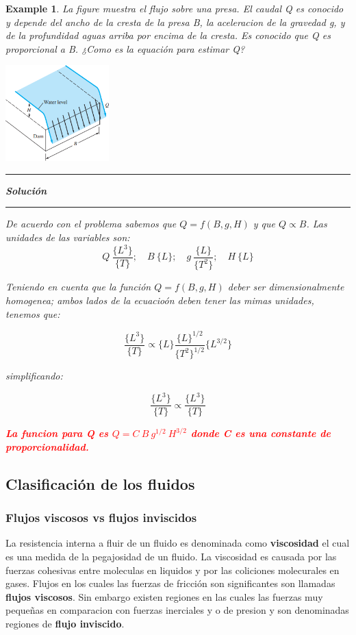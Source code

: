 \documentclass[10pt, oneside]{article}
\newtheorem{exa}{Example}
\begin{document}
\begin{shaded}
\begin{exa}
La figure muestra el flujo sobre una presa. El caudal Q es conocido y depende del ancho de la cresta de la presa B, la aceleracion de la gravedad g, y de la profundidad aguas arriba por encima de la cresta. Es conocido que Q es proporcional a B. ¿Como es la equaci\'on para estimar Q?       
\begin{center}
\includegraphics[width=4cm]{pdam}
\end{center}
\vspace{0.2cm}
\hrule
\vspace{0.2cm}
\noindent \textbf{Soluci\'on}
\vspace{0.2cm}
\hrule
\vspace{0.2cm}
De acuerdo con el problema sabemos que $Q=f(B,g,H)$ y que $Q\propto B$. Las unidades de las variables son:
$$
Q\ \frac{\{L^3\}}{\{T\}}; \quad B \ \{L\}; \quad g \ \frac{\{L\}}{\{T^2\}}; \quad H \ \{L\}
$$

Teniendo en cuenta que la funci\'on $Q=f(B,g,H)$ deber ser dimensionalmente homogenea; ambos lados de la ecuacio\'on deben tener las mimas unidades, tenemos que: 

$$
\frac{\{L^3\}}{\{T\}} \propto \{L\}  \frac{\{L\}^{1/2}}{\{T^2\}^{1/2}} \{L^{3/2}\}
$$

simplificando:

$$
\frac{\{L^3\}}{\{T\}} \propto \frac{\{L^3\}}{\{T\}}
$$


\begin{center}
\textcolor{red}{\textbf{La funcion para Q es $Q = C \ B \ g^{1/2} \ H^{3/2}$ donde C es una constante de proporcionalidad.}}
\end{center}

\end{exa}
\end{shaded}


\subsection{Clasificaci\'on de los fluidos}
\subsubsection{Flujos viscosos vs flujos inviscidos} 
La resistencia interna a fluir de un fluido es denominada como \textbf{viscosidad} el cual es una medida de la pegajosidad de un fluido. La viscosidad es causada por las fuerzas cohesivas entre moleculas en liquidos y por las coliciones molecurales en gases. Flujos en los cuales las fuerzas de fricci\'on son significantes son llamadas \textbf{flujos viscosos}. Sin embargo existen regiones en las cuales las fuerzas muy peque\~nas en comparacion con fuerzas inerciales y o de presion y son denominadas regiones de \textbf{flujo inviscido}.
\end{document}
